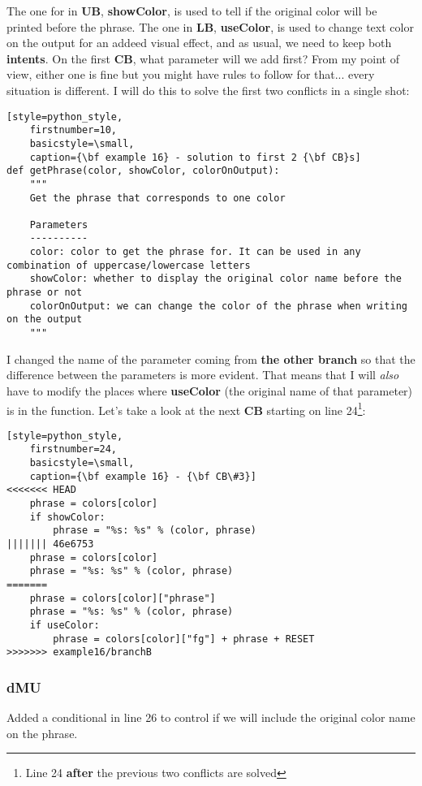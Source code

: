 The one for in {\bf UB}, {\bf showColor}, is used to tell if the original color will be printed before the phrase. The one in {\bf LB},
{\bf useColor}, is used to change text color on the output for an addeed visual effect, and as usual, we need to keep both {\bf intents}.
On the first {\bf CB}, what parameter will we add first? From my point of view, either one is fine but you might have rules to follow
for that... every situation is different. I will do this to solve the first two conflicts in a single shot:

\begin{lstlisting}[style=python_style,
	firstnumber=10,
	basicstyle=\small,
	caption={\bf example 16} - solution to first 2 {\bf CB}s]
def getPhrase(color, showColor, colorOnOutput):
    """
    Get the phrase that corresponds to one color
    
    Parameters
    ----------
    color: color to get the phrase for. It can be used in any combination of uppercase/lowercase letters
    showColor: whether to display the original color name before the phrase or not
    colorOnOutput: we can change the color of the phrase when writing on the output
    """
\end{lstlisting}

I changed the name of the parameter coming from {\bf the other branch} so that the difference between the parameters is more
evident. That means that I will {\it also} have to modify the places where {\bf useColor} (the original name of that parameter) is in
the function. Let's take a look at the next {\bf CB} starting on line 24\footnote{Line 24 {\bf after} the previous two conflicts are solved}:

\begin{lstlisting}[style=python_style,
	firstnumber=24,
	basicstyle=\small,
	caption={\bf example 16} - {\bf CB\#3}]
<<<<<<< HEAD
    phrase = colors[color]
    if showColor:
        phrase = "%s: %s" % (color, phrase)
||||||| 46e6753
    phrase = colors[color]
    phrase = "%s: %s" % (color, phrase)
=======
    phrase = colors[color]["phrase"]
    phrase = "%s: %s" % (color, phrase)
    if useColor:
        phrase = colors[color]["fg"] + phrase + RESET
>>>>>>> example16/branchB
\end{lstlisting}

\subsubsection{dMU}
Added a conditional in line 26 to control if we will include the original color name on the phrase.

